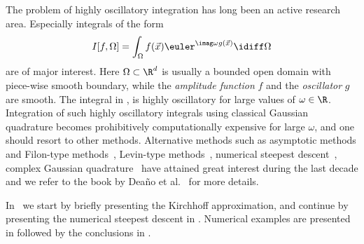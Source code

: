 The problem of highly oscillatory integration has long been an active research area. Especially integrals of the form
\begin{equation}\label{Eq4:oscillatoryIntegral}
	I[f,\Omega]=\int_{\Omega} f(\vec{x})\euler^{\imag \omega g(\vec{x})}\idiff \Omega
\end{equation}
are of major interest. Here $\Omega\subset\R^d$ is usually a bounded open domain with piece-wise smooth boundary, while the \textit{amplitude function} $f$ and the \textit{oscillator} $g$ are smooth. The integral in , is highly oscillatory for large values of $\omega\in\R$. Integration of such highly oscillatory integrals using classical Gaussian quadrature becomes prohibitively computationally expensive for large $\omega$, and one should resort to other methods. Alternative methods such as asymptotic methods and Filon-type methods~\cite{Dominguez2011sae,Iserles2004oqm,Iserles2005eqo}, Levin-type methods~\cite{Levin1996fio,Olver2006mfn}, numerical steepest descent~\cite{Huybrechs2006ote,Deano2018cho}, complex Gaussian quadrature~\cite{Asheim2013cgq,Deano2015tkp} have attained great interest during the last decade and we refer to the book by Dea{\~{n}}o et al.~\cite{Deano2018cho} for more details. 
%

In~ we start by briefly presenting the Kirchhoff approximation, and continue by presenting the numerical steepest descent in . Numerical examples are presented in  followed by the conclusions in .